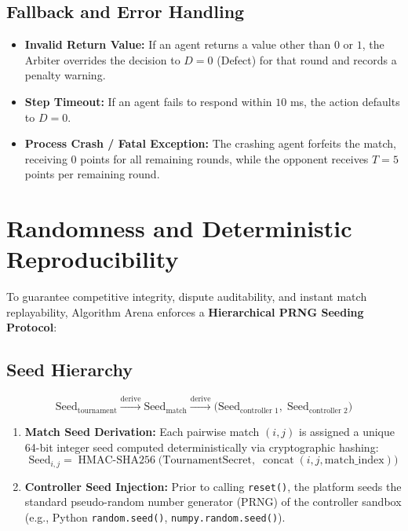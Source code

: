 \documentclass[11pt,a4paper]{article}
\begin{document}
\subsection{Fallback and Error Handling}
\begin{itemize}
    \item \textbf{Invalid Return Value:} If an agent returns a value other than $0$ or $1$, the Arbiter overrides the decision to $D = 0$ (Defect) for that round and records a penalty warning.
    \item \textbf{Step Timeout:} If an agent fails to respond within $10$ ms, the action defaults to $D = 0$.
    \item \textbf{Process Crash / Fatal Exception:} The crashing agent forfeits the match, receiving $0$ points for all remaining rounds, while the opponent receives $T = 5$ points per remaining round.
\end{itemize}


\section{Randomness and Deterministic Reproducibility}

To guarantee competitive integrity, dispute auditability, and instant match replayability, Algorithm Arena enforces a \textbf{Hierarchical PRNG Seeding Protocol}:

\subsection{Seed Hierarchy}
\[
\text{Seed}_{\text{tournament}} \xrightarrow{\text{derive}} \text{Seed}_{\text{match}} \xrightarrow{\text{derive}} \Big( \text{Seed}_{\text{controller } 1}, \; \text{Seed}_{\text{controller } 2} \Big)
\]

\begin{enumerate}
    \item \textbf{Match Seed Derivation:} Each pairwise match $(i, j)$ is assigned a unique 64-bit integer seed computed deterministically via cryptographic hashing:
    \[
    \text{Seed}_{i,j} = \operatorname{HMAC-SHA256}\Big(\text{TournamentSecret}, \; \operatorname{concat}(i, j, \text{match\_index})\Big)
    \]
    \item \textbf{Controller Seed Injection:} Prior to calling \texttt{reset()}, the platform seeds the standard pseudo-random number generator (PRNG) of the controller sandbox (e.g., Python \texttt{random.seed()}, \texttt{numpy.random.seed()}).
\end{enumerate}
\end{document}
